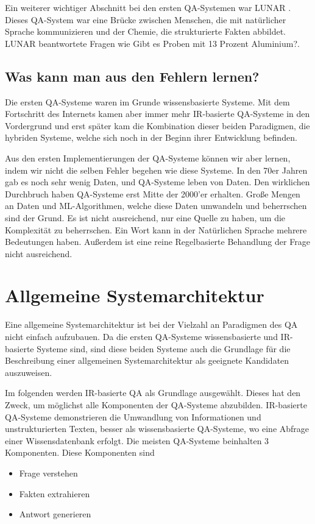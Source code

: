 \documentclass[
        ngerman,
        paper=a4,
        numbers=noendperiod,
]{scrreprt}
\begin{document}
Ein weiterer wichtiger Abschnitt bei den ersten QA-Systemen war \glqq LUNAR\grqq{} \citep{Woods1978SemanticsAnswering}. Dieses QA-System war eine Brücke zwischen Menschen, die mit natürlicher Sprache kommunizieren und der Chemie, die strukturierte Fakten abbildet. LUNAR beantwortete  Fragen wie \glqq Gibt es Proben mit 13 Prozent Aluminium?\grqq{}. 

\subsection{Was kann man aus den Fehlern lernen?}
Die ersten QA-Systeme waren im Grunde wissensbasierte Systeme. Mit dem Fortschritt des Internets kamen aber immer mehr IR-basierte QA-Systeme in den Vordergrund und erst später kam die Kombination dieser beiden Paradigmen, die hybriden Systeme, welche sich noch in der Beginn ihrer Entwicklung befinden. 

Aus den ersten Implementierungen der QA-Systeme können wir aber lernen, indem wir nicht die selben Fehler begehen wie diese Systeme. In den 70er Jahren gab es noch sehr wenig Daten, und QA-Systeme leben von Daten. Den wirklichen Durchbruch haben QA-Systeme erst Mitte der 2000'er erhalten. Große Mengen an Daten und ML-Algorithmen, welche diese Daten umwandeln und beherrschen sind der Grund. Es ist nicht ausreichend, nur eine Quelle zu haben, um die Komplexität zu beherrschen. Ein Wort kann in der Natürlichen Sprache mehrere Bedeutungen haben. Außerdem ist eine reine Regelbasierte Behandlung der Frage nicht ausreichend.

\section{Allgemeine Systemarchitektur} %
Eine allgemeine Systemarchitektur ist bei der Vielzahl an Paradigmen des QA nicht einfach aufzubauen. Da die ersten QA-Systeme wissensbasierte und IR-basierte Systeme sind, sind diese beiden Systeme auch die Grundlage für die Beschreibung einer allgemeinen Systemarchitektur als geeignete Kandidaten auszuweisen. 

Im folgenden werden IR-basierte QA als Grundlage ausgewählt. Dieses hat den Zweck, um möglichst alle Komponenten der QA-Systeme abzubilden. IR-basierte QA-Systeme demonstrieren die Umwandlung von Informationen und unstrukturierten Texten, besser als wissensbasierte QA-Systeme, wo eine Abfrage einer Wissensdatenbank erfolgt. Die meisten QA-Systeme beinhalten 3 Komponenten. Diese Komponenten sind 
\begin{itemize}
\item Frage verstehen
\item Fakten extrahieren 
\item Antwort generieren
\end{itemize}
\end{document}
